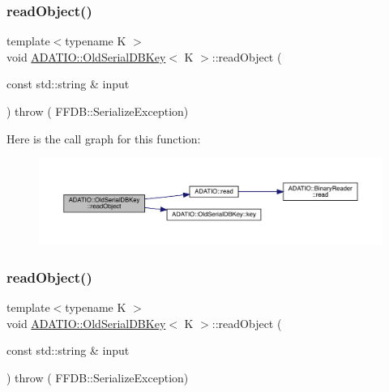 \subsubsection{\texorpdfstring{readObject()}{readObject()}\hspace{0.1cm}{\footnotesize\ttfamily [1/3]}}
{\footnotesize\ttfamily template$<$typename K $>$ \\
void \mbox{\hyperlink{classADATIO_1_1OldSerialDBKey}{A\+D\+A\+T\+I\+O\+::\+Old\+Serial\+D\+B\+Key}}$<$ K $>$\+::read\+Object (\begin{DoxyParamCaption}\item[{const std\+::string \&}]{input }\end{DoxyParamCaption}) throw ( F\+F\+D\+B\+::\+Serialize\+Exception) \hspace{0.3cm}{\ttfamily [inline]}}

Here is the call graph for this function\+:
\nopagebreak
\begin{figure}[H]
\begin{center}
\leavevmode
\includegraphics[width=350pt]{dc/d7d/classADATIO_1_1OldSerialDBKey_a4d79b5e8834dc154ddc981e153924ccd_cgraph}
\end{center}
\end{figure}
\mbox{\label{classADATIO_1_1OldSerialDBKey_a4d79b5e8834dc154ddc981e153924ccd}} 
\subsubsection{\texorpdfstring{readObject()}{readObject()}\hspace{0.1cm}{\footnotesize\ttfamily [2/3]}}
{\footnotesize\ttfamily template$<$typename K $>$ \\
void \mbox{\hyperlink{classADATIO_1_1OldSerialDBKey}{A\+D\+A\+T\+I\+O\+::\+Old\+Serial\+D\+B\+Key}}$<$ K $>$\+::read\+Object (\begin{DoxyParamCaption}\item[{const std\+::string \&}]{input }\end{DoxyParamCaption}) throw ( F\+F\+D\+B\+::\+Serialize\+Exception) \hspace{0.3cm}{\ttfamily [inline]}}

